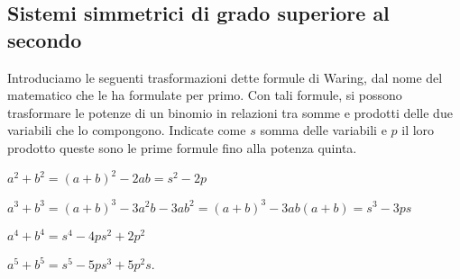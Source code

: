 \subsection{Sistemi simmetrici di grado superiore al secondo}
Introduciamo le seguenti trasformazioni dette formule di Waring, dal nome del matematico che le ha formulate per primo. Con tali formule, si possono trasformare le potenze di un binomio in relazioni tra somme e prodotti delle due variabili che lo compongono. Indicate come \(s\) somma delle variabili e \(p\) il loro prodotto queste sono le prime formule fino alla potenza quinta.
\begin{itemize*}
\item \( a^2+b^2=(a+b)^2-2{ab}=s^2-2p \)
\item \( a^3+b^3=(a+b)^3-3a^2b-3ab^2=(a+b)^3-3{ab}(a+b)=s^3-3{ps} \)
\item \( a^4+b^4=s^4-4{ps}^2+2p^2 \)
\item \( a^5+b^5=s^5-5{ps}^3+5p^2s \).
\end{itemize*}

